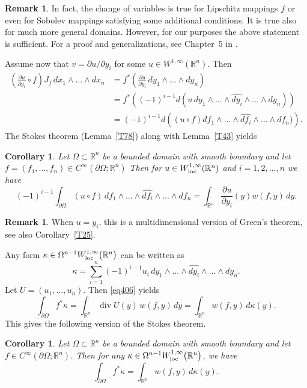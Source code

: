 \documentclass[intlimits,12pt,reqno]{amsart}
\newcommand{\R}{\mathbb R}
\numberwithin{equation}{section}
\newtheorem{corollary}[theorem]{Corollary}
\theoremstyle{definition}
\newtheorem{remark}[theorem]{Remark}
\begin{document}
\begin{remark}
In fact, the change of variables is true for Lipschitz mappings $f$ or even for Sobolev mappings satisfying some additional conditions. It is true also for much more general domains.
However, for our purposes the above statement is sufficient. For a proof and generalizations, see Chapter~5 in \cite{FG}.
\end{remark}
Assume now that
$v=\partial u/\partial y_i$ for some $u\in W^{1,\infty}(\R^n)$. Then 
\begin{align*}
\left(\frac{\partial u}{\partial y_i}\circ f\right) J_f\, dx_1\wedge\ldots\wedge dx_n 
&=
f^*\left(\frac{\partial u}{\partial y_i}\, dy_1\wedge\ldots\wedge dy_n\right)\\
&=
f^*\left((-1)^{i-1}d(u\, dy_1\wedge\ldots\wedge\widehat{dy_i}\wedge\ldots\wedge dy_n)\right)\\
&= 
(-1)^{i-1}d\left((u\circ f) df_1\wedge\ldots\wedge\widehat{df_i}\wedge\ldots\wedge df_n)\right).
\end{align*}
The Stokes theorem (Lemma~\ref{T78}) along with Lemma~\ref{T43} yields
\begin{corollary}
\label{T44}
Let $\Omega\subset\R^n$ be a bounded domain with smooth boundary and let $f=(f_1,\ldots,f_n)\in C^\infty(\partial\Omega;\R^n)$
Then for $u\in W_{\rm loc}^{1,\infty}(\R^n)$ and $i=1,2,\ldots,n$ we have
\begin{equation}
\label{eq406}
(-1)^{i-1}\int_{\partial\Omega} (u\circ f)\,df_1\wedge\ldots\wedge\widehat{df_i}\wedge\ldots\wedge df_n=
\int_{\R^n}\frac{\partial u}{\partial y_i}(y)w(f,y)\, dy.
\end{equation}
\end{corollary}
\begin{remark}
\label{R9}
When $u=y_i$, this is a multidimensional version of Green's theorem, see also Corollary~\ref{T25}.
\end{remark}
Any form $\kappa\in \Omega^{n-1}W_{\rm loc}^{1,\infty}\big(\R^n\big)$ can be written as
$$
\kappa=\sum_{i=1}^n(-1)^{i-1}u_i\, dy_1\wedge\ldots\wedge\widehat{dy_i}\wedge\ldots\wedge dy_n.
$$
Let $U=(u_1,\ldots,u_n)$. Then \eqref{eq406} yields
\begin{equation}
\label{eq8}
\int_{\partial\Omega} f^*\kappa=\int_{\R^n}\operatorname{div} U(y)\, w(f,y)\, dy=
\int_{\R^n} w(f,y)\, d\kappa(y).
\end{equation}
This gives the following version of the Stokes theorem.
\begin{corollary}
\label{T87}
Let $\Omega\subset\R^n$ be a bounded domain with smooth boundary and let $f\in C^\infty(\partial\Omega;\R^n)$. Then for any $\kappa\in \Omega^{n-1}W_{\rm loc}^{1,\infty}\big(\R^n\big)$, we have
\begin{equation}
\label{eq108}
\int_{\partial\Omega} f^*\kappa=\int_{\R^n} w(f,y)\, d\kappa(y).
\end{equation}
\end{corollary}
\end{document}
